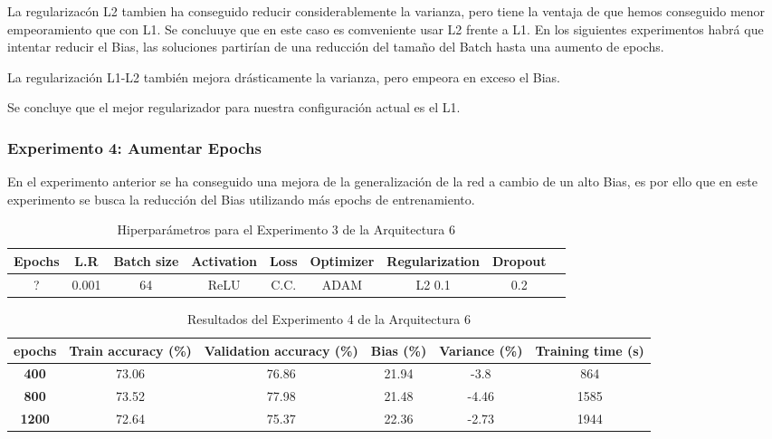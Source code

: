 \documentclass{article}
\begin{document}
           La regularizac\'on L2 tambien ha conseguido reducir considerablemente la varianza, pero tiene la ventaja de que hemos conseguido menor empeoramiento que con L1. Se concluuye que en este caso es comveniente usar L2 frente a L1. En los siguientes experimentos habr\'a que intentar reducir el Bias, las soluciones partir\'ian de una reducci\'on del tama\~{n}o del Batch hasta una aumento de epochs. 
           
  La regularizaci\'on L1-L2 tambi\'en mejora dr\'asticamente la varianza, pero empeora en exceso el Bias. 

  Se concluye que el mejor regularizador para nuestra configuraci\'on actual es el L1. 
  
   

   
        \subsubsection{Experimento 4: Aumentar Epochs}
        En el experimento anterior se ha conseguido una mejora de la generalizaci\'on de la red a cambio de un alto Bias, es por ello que en este experimento se busca la reducci\'on del Bias utilizando m\'as epochs de entrenamiento. 
        
        \begin{table}[!h]
				\begin{tabular}{|c|c|c|c|c|c|c|c|c|}
					\textbf{Epochs}&\textbf{L.R}&\textbf{Batch size}&\textbf{Activation}&\textbf{Loss}&\textbf{Optimizer}&\textbf{Regularization}&\textbf{Dropout}   \\ \hline
					? & 0.001 & 64 & ReLU & C.C. & ADAM & L2 0.1 & 0.2 
				\end{tabular}
				\caption{Hiperpar\'ametros para el Experimento 3 de la Arquitectura 6}
				\label{tab:hip-a6-e2}
			\end{table}

    
   
   \begin{table}[!h]
				\begin{center}
					\begin{tabular}{ c | c | c | c | c | c |}
						 \textbf{epochs} & \textbf{Train accuracy (\%)} & \textbf{Validation accuracy (\%)} & \textbf{Bias (\%)} & \textbf{Variance (\%)} & \textbf{Training time (s)} \\ \hline
						\textbf{400 } & 73.06   & 76.86 &  21.94 & -3.8 &864   \\ \hline
                        \textbf{800 } & 73.52   &77.98 &  21.48 & -4.46  &1585    \\ \hline
                        \textbf{1200} &  72.64  &75.37  &  22.36& -2.73 &1944    \\ \hline
					\end{tabular}
					\caption{Resultados del Experimento 4 de la Arquitectura 6}
					\label{tab:res-a2-e5}
				\end{center}
			\end{table}
\end{document}
